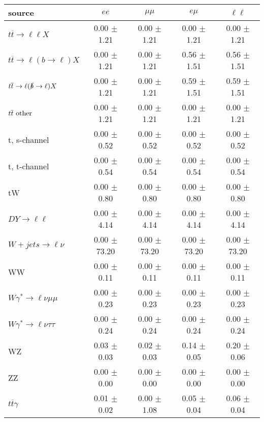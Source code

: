 \begin{tabular}{l|cccc} \hline\hline
source & $ee$ & $\mu\mu$ & $e\mu$ & $\ell\ell $ \\
\hline
$t\overline{t} \rightarrow \ell \ell X$ &  0.00 $\pm$  1.21 &  0.00 $\pm$  1.21 &  0.00 $\pm$  1.21 &  0.00 $\pm$  1.21 \\
$t\overline{t} \rightarrow \ell (b \rightarrow \ell) X$ &  0.00 $\pm$  1.21 &  0.00 $\pm$  1.21 &  0.56 $\pm$  1.51 &  0.56 $\pm$  1.51 \\
$t\overline{t} \rightarrow \ell (\slashed b \rightarrow \ell) X$ &  0.00 $\pm$  1.21 &  0.00 $\pm$  1.21 &  0.59 $\pm$  1.51 &  0.59 $\pm$  1.51 \\
        $t\overline{t}\ \rm{other}$ &  0.00 $\pm$  1.21 &  0.00 $\pm$  1.21 &  0.00 $\pm$  1.21 &  0.00 $\pm$  1.21 \\
\hline
                       t, s-channel &  0.00 $\pm$  0.52 &  0.00 $\pm$  0.52 &  0.00 $\pm$  0.52 &  0.00 $\pm$  0.52 \\
                       t, t-channel &  0.00 $\pm$  0.54 &  0.00 $\pm$  0.54 &  0.00 $\pm$  0.54 &  0.00 $\pm$  0.54 \\
                                 tW &  0.00 $\pm$  0.80 &  0.00 $\pm$  0.80 &  0.00 $\pm$  0.80 &  0.00 $\pm$  0.80 \\
\hline
         $DY \rightarrow \ell \ell$ &  0.00 $\pm$  4.14 &  0.00 $\pm$  4.14 &  0.00 $\pm$  4.14 &  0.00 $\pm$  4.14 \\
      $W+jets \rightarrow \ell \nu$ &  0.00 $\pm$ 73.20 &  0.00 $\pm$ 73.20 &  0.00 $\pm$ 73.20 &  0.00 $\pm$ 73.20 \\
                                 WW &  0.00 $\pm$  0.11 &  0.00 $\pm$  0.11 &  0.00 $\pm$  0.11 &  0.00 $\pm$  0.11 \\
\hline
$W\gamma^{*} \rightarrow \ell \nu \mu\mu$ &  0.00 $\pm$  0.23 &  0.00 $\pm$  0.23 &  0.00 $\pm$  0.23 &  0.00 $\pm$  0.23 \\
$W\gamma^{*} \rightarrow \ell \nu \tau\tau$ &  0.00 $\pm$  0.24 &  0.00 $\pm$  0.24 &  0.00 $\pm$  0.24 &  0.00 $\pm$  0.24 \\
                                 WZ &  0.03 $\pm$  0.03 &  0.02 $\pm$  0.03 &  0.14 $\pm$  0.05 &  0.20 $\pm$  0.06 \\
                                 ZZ &  0.00 $\pm$  0.00 &  0.00 $\pm$  0.00 &  0.00 $\pm$  0.00 &  0.00 $\pm$  0.00 \\
\hline
              $t\overline{t}\gamma$ &  0.01 $\pm$  0.02 &  0.00 $\pm$  1.08 &  0.05 $\pm$  0.04 &  0.06 $\pm$  0.04 \\

\end{tabular}
